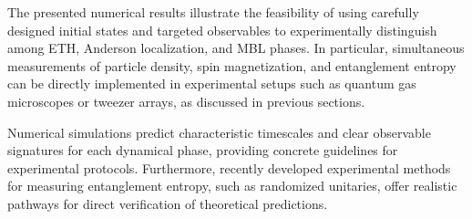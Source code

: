 


The presented numerical results illustrate the feasibility of using carefully designed initial states and targeted observables to experimentally distinguish among ETH, Anderson localization, and MBL phases. In particular, simultaneous measurements of particle density, spin magnetization, and entanglement entropy can be directly implemented in experimental setups such as quantum gas microscopes or tweezer arrays, as discussed in previous sections.

Numerical simulations predict characteristic timescales and clear observable signatures for each dynamical phase, providing concrete guidelines for experimental protocols. Furthermore, recently developed experimental methods for measuring entanglement entropy, such as randomized unitaries, offer realistic pathways for direct verification of theoretical predictions.







